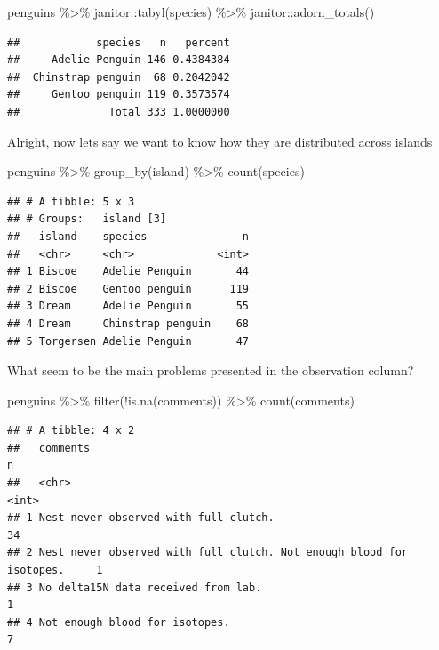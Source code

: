 \documentclass[
]{book}
\newenvironment{Shaded}{\begin{snugshade}}{\end{snugshade}}
\newcommand{\FunctionTok}[1]{\textcolor[rgb]{0.00,0.00,0.00}{#1}}
\newcommand{\NormalTok}[1]{#1}
\newcommand{\SpecialCharTok}[1]{\textcolor[rgb]{0.00,0.00,0.00}{#1}}
\begin{document}
\begin{Shaded}
\begin{Highlighting}[]
\NormalTok{penguins }\SpecialCharTok{\%\textgreater{}\%} 
\NormalTok{  janitor}\SpecialCharTok{::}\FunctionTok{tabyl}\NormalTok{(species) }\SpecialCharTok{\%\textgreater{}\%} 
\NormalTok{  janitor}\SpecialCharTok{::}\FunctionTok{adorn\_totals}\NormalTok{()}
\end{Highlighting}
\end{Shaded}

\begin{verbatim}
##            species   n   percent
##     Adelie Penguin 146 0.4384384
##  Chinstrap penguin  68 0.2042042
##     Gentoo penguin 119 0.3573574
##              Total 333 1.0000000
\end{verbatim}

Alright, now lets say we want to know how they are distributed across islands

\begin{Shaded}
\begin{Highlighting}[]
\NormalTok{penguins }\SpecialCharTok{\%\textgreater{}\%} 
  \FunctionTok{group\_by}\NormalTok{(island) }\SpecialCharTok{\%\textgreater{}\%} 
  \FunctionTok{count}\NormalTok{(species)}
\end{Highlighting}
\end{Shaded}

\begin{verbatim}
## # A tibble: 5 x 3
## # Groups:   island [3]
##   island    species               n
##   <chr>     <chr>             <int>
## 1 Biscoe    Adelie Penguin       44
## 2 Biscoe    Gentoo penguin      119
## 3 Dream     Adelie Penguin       55
## 4 Dream     Chinstrap penguin    68
## 5 Torgersen Adelie Penguin       47
\end{verbatim}

What seem to be the main problems presented in the observation column?

\begin{Shaded}
\begin{Highlighting}[]
\NormalTok{penguins }\SpecialCharTok{\%\textgreater{}\%}
  \FunctionTok{filter}\NormalTok{(}\SpecialCharTok{!}\FunctionTok{is.na}\NormalTok{(comments)) }\SpecialCharTok{\%\textgreater{}\%} 
  \FunctionTok{count}\NormalTok{(comments)}
\end{Highlighting}
\end{Shaded}

\begin{verbatim}
## # A tibble: 4 x 2
##   comments                                                                 n
##   <chr>                                                                <int>
## 1 Nest never observed with full clutch.                                   34
## 2 Nest never observed with full clutch. Not enough blood for isotopes.     1
## 3 No delta15N data received from lab.                                      1
## 4 Not enough blood for isotopes.                                           7
\end{verbatim}
\end{document}
